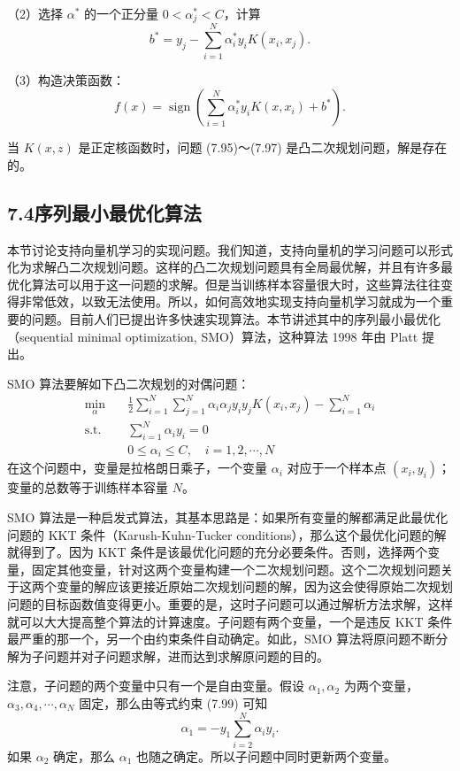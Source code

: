 \documentclass[UTF8, 12pt, fontset=fandol, oneside]{ctexart}
\begin{document}
（2）选择 $\alpha^*$ 的一个正分量 $0<\alpha_j^*<C$，计算
\[
b^*=y_j-\sum_{i=1}^N\alpha_i^*y_iK(x_i,x_j).
\]

（3）构造决策函数：
\[
f(x)=\operatorname{sign}\left(\sum_{i=1}^N\alpha_i^*y_iK(x,x_i)+b^*\right).
\]

当 $K(x,z)$ 是正定核函数时，问题 (7.95)～(7.97) 是凸二次规划问题，解是存在的。

\subsection*{7.4\quad 序列最小最优化算法}

本节讨论支持向量机学习的实现问题。我们知道，支持向量机的学习问题可以形式化为求解凸二次规划问题。这样的凸二次规划问题具有全局最优解，并且有许多最优化算法可以用于这一问题的求解。但是当训练样本容量很大时，这些算法往往变得非常低效，以致无法使用。所以，如何高效地实现支持向量机学习就成为一个重要的问题。目前人们已提出许多快速实现算法。本节讲述其中的序列最小最优化（sequential minimal optimization, SMO）算法，这种算法 1998 年由 Platt 提出。

SMO 算法要解如下凸二次规划的对偶问题：
\begin{equation}
\begin{aligned}
\min_\alpha\quad & \frac{1}{2}\sum_{i=1}^N\sum_{j=1}^N\alpha_i\alpha_j y_i y_jK(x_i,x_j)-\sum_{i=1}^N\alpha_i\\
\mathrm{s.t.}\quad & \sum_{i=1}^N\alpha_i y_i=0\\
& 0\leq \alpha_i\leq C,\quad i=1,2,\cdots,N
\end{aligned}
\tag{7.98--7.100}
\end{equation}
在这个问题中，变量是拉格朗日乘子，一个变量 $\alpha_i$ 对应于一个样本点 $(x_i,y_i)$；变量的总数等于训练样本容量 $N$。

SMO 算法是一种启发式算法，其基本思路是：如果所有变量的解都满足此最优化问题的 KKT 条件（Karush-Kuhn-Tucker conditions），那么这个最优化问题的解就得到了。因为 KKT 条件是该最优化问题的充分必要条件。否则，选择两个变量，固定其他变量，针对这两个变量构建一个二次规划问题。这个二次规划问题关于这两个变量的解应该更接近原始二次规划问题的解，因为这会使得原始二次规划问题的目标函数值变得更小。重要的是，这时子问题可以通过解析方法求解，这样就可以大大提高整个算法的计算速度。子问题有两个变量，一个是违反 KKT 条件最严重的那一个，另一个由约束条件自动确定。如此，SMO 算法将原问题不断分解为子问题并对子问题求解，进而达到求解原问题的目的。

注意，子问题的两个变量中只有一个是自由变量。假设 $\alpha_1,\alpha_2$ 为两个变量，$\alpha_3,\alpha_4,\cdots,\alpha_N$ 固定，那么由等式约束 (7.99) 可知
\[
\alpha_1=-y_1\sum_{i=2}^N\alpha_i y_i.
\]
如果 $\alpha_2$ 确定，那么 $\alpha_1$ 也随之确定。所以子问题中同时更新两个变量。
\end{document}
